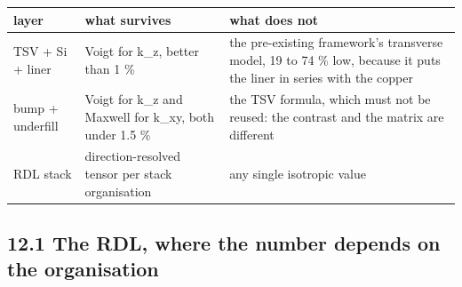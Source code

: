 \documentclass[10pt,]{article}
\begin{document}
\begin{longtable}[]{@{}lll@{}}
\toprule
\begin{minipage}[b]{0.30\columnwidth}\raggedright
layer\strut
\end{minipage} & \begin{minipage}[b]{0.30\columnwidth}\raggedright
what survives\strut
\end{minipage} & \begin{minipage}[b]{0.30\columnwidth}\raggedright
what does not\strut
\end{minipage}\tabularnewline
\midrule
\endhead
\begin{minipage}[t]{0.30\columnwidth}\raggedright
TSV + Si + liner\strut
\end{minipage} & \begin{minipage}[t]{0.30\columnwidth}\raggedright
Voigt for k\_z, better than 1 \%\strut
\end{minipage} & \begin{minipage}[t]{0.30\columnwidth}\raggedright
the pre-existing framework's transverse model, 19 to 74 \% low, because
it puts the liner in series with the copper\strut
\end{minipage}\tabularnewline
\begin{minipage}[t]{0.30\columnwidth}\raggedright
bump + underfill\strut
\end{minipage} & \begin{minipage}[t]{0.30\columnwidth}\raggedright
Voigt for k\_z and Maxwell for k\_xy, both under 1.5 \%\strut
\end{minipage} & \begin{minipage}[t]{0.30\columnwidth}\raggedright
the TSV formula, which must not be reused: the contrast and the matrix
are different\strut
\end{minipage}\tabularnewline
\begin{minipage}[t]{0.30\columnwidth}\raggedright
RDL stack\strut
\end{minipage} & \begin{minipage}[t]{0.30\columnwidth}\raggedright
direction-resolved tensor per stack organisation\strut
\end{minipage} & \begin{minipage}[t]{0.30\columnwidth}\raggedright
any single isotropic value\strut
\end{minipage}\tabularnewline
\bottomrule
\end{longtable}

\hypertarget{the-rdl-where-the-number-depends-on-the-organisation}{%
\subsection{12.1 The RDL, where the number depends on the
organisation}\label{the-rdl-where-the-number-depends-on-the-organisation}}
\end{document}
